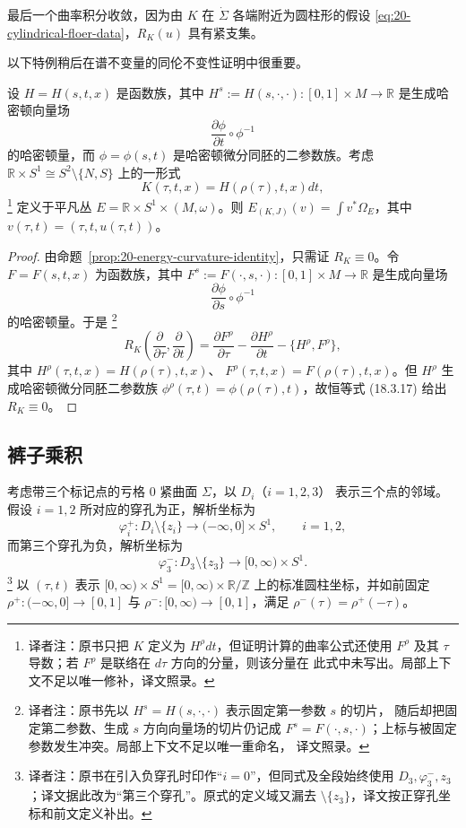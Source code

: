 \begin{remark}
\label{rem:20-curvature-integral-converges}
最后一个曲率积分收敛，因为由 $K$ 在 $\dot\Sigma$ 各端附近为圆柱形的假设
\eqref{eq:20-cylindrical-floer-data}，$R_K(u)$ 具有紧支集。
\end{remark}

以下特例稍后在谱不变量的同伦不变性证明中很重要。

\begin{corollary}
\label{cor:20-flat-two-parameter-family}
设 $H=H(s,t,x)$ 是函数族，其中
$H^s:=H(s,\cdot,\cdot):[0,1]\times M\to\mathbb R$ 是生成哈密顿向量场
\[
 \frac{\partial\phi}{\partial t}\circ\phi^{-1}
\]
的哈密顿量，而 $\phi=\phi(s,t)$ 是哈密顿微分同胚的二参数族。考虑
$\mathbb R\times S^1\cong S^2\setminus\{N,S\}$ 上的一形式
\[
 K(\tau,t,x)=H(\rho(\tau),t,x)dt,
\]
\footnote{译者注：原书只把 $K$ 定义为 $H^\rho dt$，但证明计算的曲率公式还使用
$F^\rho$ 及其 $\tau$ 导数；若 $F^\rho$ 是联络在 $d\tau$ 方向的分量，则该分量在
此式中未写出。局部上下文不足以唯一修补，译文照录。}
定义于平凡丛 $E=\mathbb R\times S^1\times(M,\omega)$。则
$E_{(K,J)}(v)=\int v^*\Omega_E$，其中
$v(\tau,t)=(\tau,t,u(\tau,t))$。
\end{corollary}

\begin{proof}
由命题~\ref{prop:20-energy-curvature-identity}，只需证 $R_K\equiv0$。令
$F=F(s,t,x)$ 为函数族，其中 $F^s:=F(\cdot,s,\cdot):[0,1]\times M\to\mathbb R$
是生成向量场
\[
 \frac{\partial\phi}{\partial s}\circ\phi^{-1}
\]
的哈密顿量。于是
\footnote{译者注：原书先以 $H^s=H(s,\cdot,\cdot)$ 表示固定第一参数 $s$ 的切片，
随后却把固定第二参数、生成 $s$ 方向向量场的切片仍记成
$F^s=F(\cdot,s,\cdot)$；上标与被固定参数发生冲突。局部上下文不足以唯一重命名，
译文照录。}
\[
 R_K\left(\frac{\partial}{\partial\tau},\frac{\partial}{\partial t}\right)
 =\frac{\partial F^\rho}{\partial\tau}
 -\frac{\partial H^\rho}{\partial t}-\{H^\rho,F^\rho\},
\]
其中 $H^\rho(\tau,t,x)=H(\rho(\tau),t,x)$、
$F^\rho(\tau,t,x)=F(\rho(\tau),t,x)$。但 $H^\rho$ 生成哈密顿微分同胚二参数族
$\phi^\rho(\tau,t)=\phi(\rho(\tau),t)$，故恒等式 (18.3.17) 给出 $R_K\equiv0$。
\end{proof}

\subsection{裤子乘积}

考虑带三个标记点的亏格 $0$ 紧\personRiemann{}曲面 $\Sigma$，以 $D_i$（$i=1,2,3$）
表示三个点的邻域。假设 $i=1,2$ 所对应的穿孔为正，解析坐标为
\[
 \varphi_i^+:D_i\setminus\{z_i\}\to(-\infty,0]\times S^1,
 \qquad i=1,2,
\]
而第三个穿孔为负，解析坐标为
\[
 \varphi_3^-:D_3\setminus\{z_3\}\to[0,\infty)\times S^1.
\]
\footnote{译者注：原书在引入负穿孔时印作“$i=0$”，但同式及全段始终使用
$D_3,\varphi_3^-,z_3$；译文据此改为“第三个穿孔”。原式的定义域又漏去
$\setminus\{z_3\}$，译文按正穿孔坐标和前文定义补出。}
以 $(\tau,t)$ 表示 $[0,\infty)\times S^1=[0,\infty)\times\mathbb R/\mathbb Z$
上的标准圆柱坐标，并如前固定 $\rho^+:(-\infty,0]\to[0,1]$ 与
$\rho^-:[0,\infty)\to[0,1]$，满足 $\rho^-(\tau)=\rho^+(-\tau)$。

